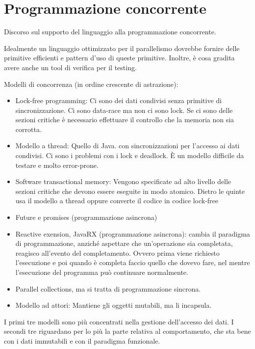 \section{Programmazione concorrente}

Discorso sul supporto del linguaggio alla programmazione concorrente.

Idealmente un linguaggio ottimizzato per il parallelismo dovrebbe fornire delle primitive efficienti e pattern d'uso di queste primitive. Inoltre, è cosa gradita avere anche un tool di verifica per il testing.

Modelli di concorrenza (in ordine crescente di astrazione):

\begin{itemize}
	\item Lock-free programming: Ci sono dei dati condivisi senza primitive di sincronizzazione. Ci sono data-race ma non ci sono lock. Se ci sono delle sezioni critiche è necessario effettuare il controllo che la memoria non sia corrotta.
	\item Modello a thread: Quello di Java. con sincronizzazioni per l'accesso ai dati condivisi. Ci sono i problemi con i lock e deadlock. \`E un modello difficile da testare e molto error-prone.
	\item Software transactional memory: Vengono specificate ad alto livello delle sezioni critiche che devono essere eseguite in modo atomico. Dietro le quinte usa il modello a thread oppure converte il codice in codice lock-free
	\item Future e promises (programmazione asincrona)
	\item Reactive exension, JavaRX (programmazione asincrona): cambia il paradigma di programmazione, anziché aspettare che un'operazione sia completata, reagisco all'evento del completamento. Ovvero prima viene richiesto l'esecuzione e poi quando è completa faccio quello che dovevo fare, nel mentre l'esecuzione del programma può continuare normalmente.
	\item Parallel collections, ma si tratta di programmazione sincrona.
	\item Modello ad attori: Mantiene gli oggetti mutabili, ma li incapsula.
\end{itemize}

I primi tre modelli sono più concentrati nella gestione dell'accesso dei dati.
I secondi tre riguardano per lo più la parte relativa al comportamento, che sta bene con i dati immutabili e con il paradigma funzionale.

